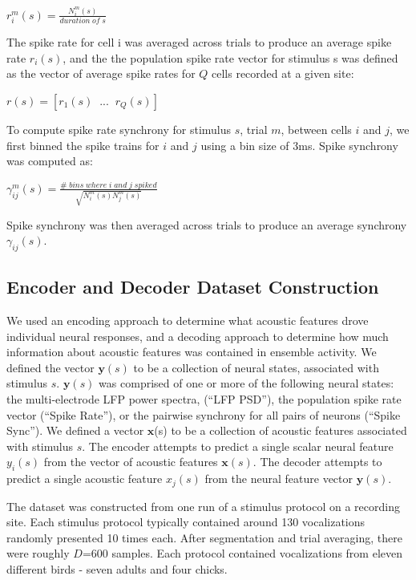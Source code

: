 \begin{center}
$r_i^m (s) = \frac{N_i^m (s)}{duration \; of \; s}$
\end{center}

The spike rate for cell i was averaged across trials to produce an average spike rate $r_i (s)$, and the the population spike rate vector for stimulus s was defined as the vector of average spike rates for $Q$ cells recorded at a given site:

\begin{center}
$r(s) = [r_1(s) \;\; ... \;\; r_Q (s)]$
\end{center}

    To compute spike rate synchrony for stimulus $s$, trial $m$, between cells $i$ and $j$, we first binned the spike trains for $i$ and $j$ using a bin size of 3ms. Spike synchrony was computed as:

\begin{center}
$\gamma _{ij} ^m (s)=\frac{\# \; bins\; where\; i\; and \; j\; spiked}{\sqrt{N_i^m(s) N_j^m (s)}}$ 
\end{center}

Spike synchrony was then averaged across trials to produce an average synchrony $\gamma _{ij}(s)$.


\subsection{Encoder and Decoder Dataset Construction}

    We used an encoding approach to determine what acoustic features drove individual neural responses, and a decoding approach to determine how much information about acoustic features was contained in ensemble activity. We defined the vector $\textbf{y}(s)$ to be a collection of neural states, associated with stimulus $s$. $\textbf{y}(s)$ was comprised of one or more of the following neural states: the multi-electrode LFP power spectra, (``LFP PSD''), the population spike rate vector (``Spike Rate''), or the pairwise synchrony for all pairs of neurons (``Spike Sync''). We defined a vector $\textbf{x}$(s) to be a collection of acoustic features associated with stimulus $s$. The encoder attempts to predict a single scalar neural feature $y_i(s)$ from the vector of acoustic features $\textbf{x}(s)$. The decoder attempts to predict a single acoustic feature $x_j (s)$ from the neural feature vector $\textbf{y}(s)$.

The dataset was constructed from one run of a stimulus protocol on a recording site. Each stimulus protocol typically contained around 130 vocalizations randomly presented 10 times each. After segmentation and trial averaging, there were roughly $D$=600 samples. Each protocol contained vocalizations from eleven different birds - seven adults and four chicks. 


